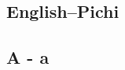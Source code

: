 \newpage

\begin{multicols}{2}
\section{English–Pichi}
\end{multicols}
\subsection*{{A  -  a}}
\begin{multicols}{2}
\begin{styleFinderlistParagraph}
 \textstylefstandard{;}
\end{styleFinderlistParagraph}

\begin{styleFinderlistParagraph}
  
\end{styleFinderlistParagraph}

\begin{styleFinderlistParagraph}
 
\end{styleFinderlistParagraph}

\begin{styleFinderlistParagraph}
 
\end{styleFinderlistParagraph}

\begin{styleFinderlistParagraph}
 \textstylefstandard{,}\textstylefvernacular{} 
\end{styleFinderlistParagraph}

\begin{styleFinderlistParagraph}
 
\end{styleFinderlistParagraph}

\begin{styleFinderlistParagraph}
 
\end{styleFinderlistParagraph}


\end{multicols}
